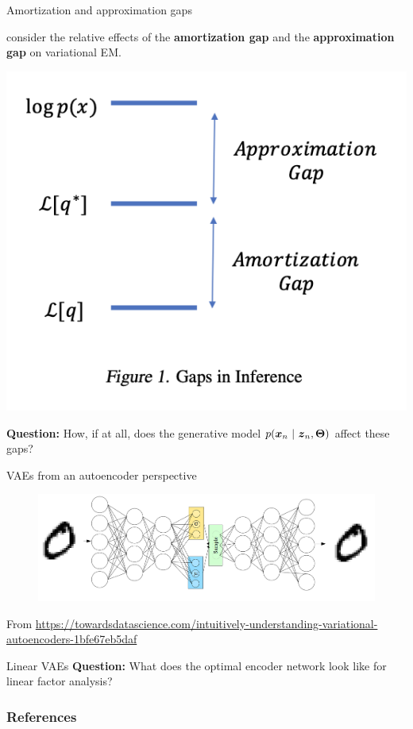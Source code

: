 \documentclass[aspectratio=169]{beamer}
\begin{document}
\begin{frame}{Amortization and approximation gaps}
    
\citet{cremer2018inference} consider the relative  effects of the \textbf{amortization gap} and the \textbf{approximation gap} on variational EM.

\begin{center}
\includegraphics[width=.4\textwidth]{figures/lap6/gaps.png}
\end{center}

\textbf{Question: } How, if at all, does the generative model $p(\boldsymbol{x}_n ~\vert~ \boldsymbol{z}_n, \boldsymbol{\Theta})$ affect these gaps? 
\end{frame}

\begin{frame}{VAEs from an autoencoder perspective}
\begin{figure}
    \centering
    \includegraphics[width=.9\textwidth]{figures/lap6/vae.png}
    \label{fig:vae}
\end{figure}

\footnotesize From \url{https://towardsdatascience.com/intuitively-understanding-variational-autoencoders-1bfe67eb5daf}
\end{frame}

\begin{frame}[t]{Linear VAEs}
\textbf{Question: } What does the optimal encoder network look like for linear factor analysis?
    
\end{frame}

\begin{frame}[t,allowframebreaks]
        \frametitle{References}
        
        
\end{frame}
\end{document}
